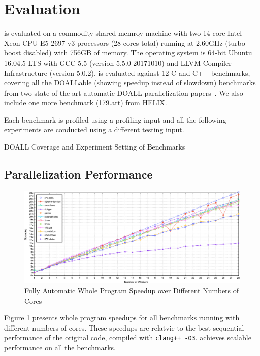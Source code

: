 \section{Evaluation}

\name is evaluated on a commodity shared-memroy machine with two 14-core
Intel Xeon CPU E5-2697 v3 processors (28 cores total) running at 2.60GHz
(turbo-boost disabled) with 756GB of memory. The operating system is 64-bit
Ubuntu 16.04.5 LTS with GCC 5.5 (version 5.5.0 20171010) and LLVM Compiler
Infrastructure (version 5.0.2).
%
\name is evaluated against 12 C and C++ benchmarks, covering all the
DOALLable (showing speedup instead of slowdown) benchmarks from two
state-of-the-art automatic DOALL parallelization
papers~\cite{johnson:12:pldi,kim:12:cgo}. We also include one more
benchmark (179.art) from HELIX.

%
Each benchmark is profiled using a profiling input and all the following
experiments are conducted using a different testing input.

\begin{table}
  
  \caption{
    DOALL Coverage and Experiment Setting of Benchmarks
  }
  \label{tab:benchmark-list}
    \vspace{-5pt}
\end{table}

\subsection{Parallelization Performance}

\begin{figure}[ht]
  \includegraphics[width=\textwidth]{figures/multi-core-crop}
  \caption{Fully Automatic Whole Program Speedup over Different Numbers of Cores}
  \label{fig:multi-core-scale}
\end{figure}

Figure \ref{fig:multi-core-scale} presents whole program speedups for
all benchmarks running with different numbers of cores. These speedups are
relatvie to the best sequential performance of the original code, compiled
with \texttt{clang++ -O3}. \name achieves scalable performance on all the
benchmarks.

